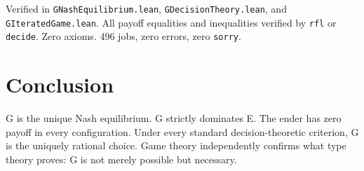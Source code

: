 \documentclass[12pt,a4paper]{article}
\begin{document}
Verified in \texttt{GNashEquilibrium.lean}, \texttt{GDecisionTheory.lean},
and \texttt{GIteratedGame.lean}. All payoff equalities and inequalities
verified by \texttt{rfl} or \texttt{decide}. Zero axioms.
496 jobs, zero errors, zero \texttt{sorry}.

\section{Conclusion}

G is the unique Nash equilibrium. G strictly dominates E. The ender has
zero payoff in every configuration. Under every standard decision-theoretic
criterion, G is the uniquely rational choice. Game theory independently
confirms what type theory proves: G is not merely possible but necessary.
\end{document}
